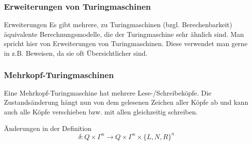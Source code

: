 \documentclass{beamer}
\begin{document}
\begin{frame}
\frametitle{Erweiterungen von Turingmaschinen}
\begin{block}{Erweiterungen}
Es gibt mehrere, zu Turingmaschinen (bzgl. Berechenbarkeit) äquivalente Berechnungsmodelle, die der Turingmaschine sehr ähnlich sind. Man spricht hier von Erweiterungen von Turingmaschinen. Diese verwendet man gerne in z.B. Beweisen, da sie oft Übersichtlicher sind.
\end{block}
\end{frame}
\begin{frame}
\frametitle{Mehrkopf-Turingmaschinen}
\vspace{-2cm}
\begin{figure}[H]
\begin{center}
\end{center}
\end{figure}
Eine Mehrkopf-Turingmaschine hat mehrere Lese-/Schreibeköpfe. Die Zustandsänderung hängt nun von dem gelesenen Zeichen aller Köpfe ab und kann auch alle Köpfe verschieben bzw. mit allen gleichzeitig schreiben.
\begin{block}{Änderungen in der Definition}
$$ \delta: Q \times \Gamma^n \rightarrow Q \times \Gamma^n \times \{L,N,R\}^n$$
\end{block}
\end{frame}
\end{document}
